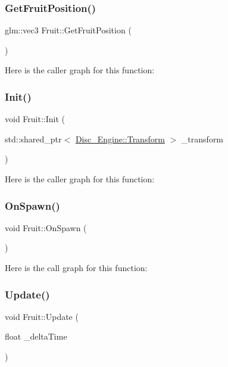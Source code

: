 \subsubsection{\texorpdfstring{Get\+Fruit\+Position()}{GetFruitPosition()}}
{\footnotesize\ttfamily glm\+::vec3 Fruit\+::\+Get\+Fruit\+Position (\begin{DoxyParamCaption}{ }\end{DoxyParamCaption})}

Here is the caller graph for this function\+:
\mbox{\label{class_fruit_ac07906720903451d43546138819d2ea0}} 
\subsubsection{\texorpdfstring{Init()}{Init()}}
{\footnotesize\ttfamily void Fruit\+::\+Init (\begin{DoxyParamCaption}\item[{std\+::shared\+\_\+ptr$<$ \mbox{\hyperlink{class_disc___engine_1_1_transform}{Disc\+\_\+\+Engine\+::\+Transform}} $>$}]{\+\_\+transform }\end{DoxyParamCaption})}

Here is the caller graph for this function\+:
\mbox{\label{class_fruit_a3783bb826140cce1ae00178c6b306b10}} 
\subsubsection{\texorpdfstring{On\+Spawn()}{OnSpawn()}}
{\footnotesize\ttfamily void Fruit\+::\+On\+Spawn (\begin{DoxyParamCaption}{ }\end{DoxyParamCaption})}

Here is the call graph for this function\+:
\mbox{\label{class_fruit_afde7b65e056caaa0fba2645d7574f724}} 
\subsubsection{\texorpdfstring{Update()}{Update()}}
{\footnotesize\ttfamily void Fruit\+::\+Update (\begin{DoxyParamCaption}\item[{float}]{\+\_\+delta\+Time }\end{DoxyParamCaption})}



